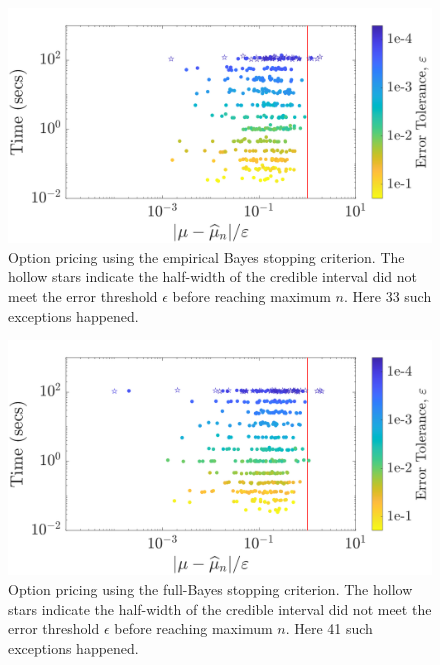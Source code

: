 \documentclass[graybox,footinfo]{svmult}
\begin{document}
\begin{figure}
\centering
\includegraphics[width=0.95\linewidth]{"figures/Sobol/Sobol_optPrice_guaranteed_time_MLE__d12_r1_2019-Sep-1"}
\caption[Sobol: Option pricing guaranteed:EB]{Option pricing using the empirical Bayes stopping criterion. The hollow stars indicate the half-width of the credible interval did not meet the error threshold $\epsilon$ before reaching maximum $n$. Here 33 such exceptions happened.}
\label{FJ:fig:Sobol-optprice-guaranteed-EB}
\end{figure}
\begin{figure}
\centering
\includegraphics[width=0.95\linewidth]{"figures/Sobol/Sobol_optPrice_guaranteed_time_full__d12_r1_2019-Sep-1"}
\caption[Sobol: Option pricing guaranteed: Full Bayes]{Option pricing using the full-Bayes stopping criterion. The hollow stars indicate the half-width of the credible interval did not meet the error threshold $\epsilon$ before reaching maximum $n$. Here 41 such exceptions happened.
}
\label{FJ:fig:Sobol-optprice-guaranteed-FB}
\end{figure}
\end{document}
